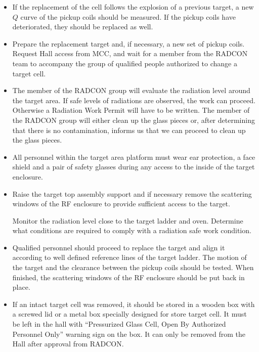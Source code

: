 \begin{itemize}
\item 
If the replacement of the cell follows the explosion of a previous
target, a new $Q$ curve of the pickup coils should be measured. If the
pickup coils have deteriorated, they should be replaced as well.

\item 
Prepare the replacement target and, if necessary, a new set of
pickup coils. Request Hall access from MCC, and wait for a member from
the RADCON team to accompany the group of qualified people authorized
to change a target cell.

\item  
The member of the RADCON group will evaluate the radiation level
around the target area. If safe levels of radiations are observed, the
work can proceed. Otherwise a Radiation Work Permit will have to be
written. The member of the RADCON group will either clean up the 
glass pieces or, after determining that there is no contamination, informs 
us that we can proceed to clean up the glass pieces.

\item 
\begin{safetyen}{10}{5}
All personnel within the target area platform must wear ear
protection, a face shield and a pair of safety glasses 
during any access to the inside of the target enclosure.
\end{safetyen}
\item  
Raise the target top assembly support and if necessary remove the
scattering windows of the RF enclosure to provide sufficient
access to the target.  
\begin{safetyen}{10}{5}
Monitor the radiation level close to the target
ladder and oven.  Determine what conditions are required to comply
with a radiation safe work condition.
\end{safetyen}

\item 
Qualified personnel should proceed to replace the target and align it
according to well defined reference lines of the target ladder. The
motion of the target and the clearance between the pickup
coils should be tested. When finished, the scattering windows of
the RF enclosure should be put back in place. 

\item 
\begin{safetyen}{10}{5}
If an intact target cell was removed, it should be stored in a wooden
box with a screwed lid or a metal box specially designed for store
target cell. It must be left in the hall with 
``Pressurized Glass Cell, Open By Authorized Personnel Only'' warning sign 
on the box. It can only be
removed from the Hall after approval from RADCON.
\end{safetyen}

\end{itemize}

